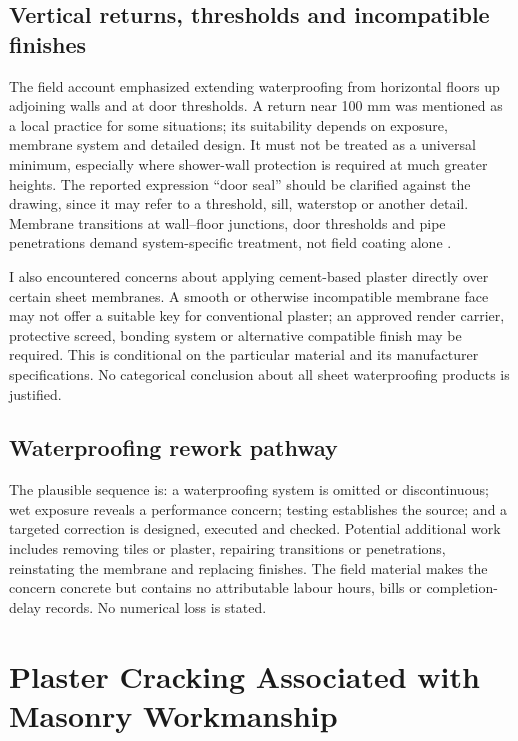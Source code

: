\subsection{Vertical returns, thresholds and incompatible finishes}
The field account emphasized extending waterproofing from horizontal floors up adjoining walls and at door thresholds. A return near 100 mm was mentioned as a local practice for some situations; its suitability depends on exposure, membrane system and detailed design. It must not be treated as a universal minimum, especially where shower-wall protection is required at much greater heights. The reported expression ``door seal'' should be clarified against the drawing, since it may refer to a threshold, sill, waterstop or another detail. Membrane transitions at wall--floor junctions, door thresholds and pipe penetrations demand system-specific treatment, not field coating alone \parencite{laticrete2026,schluter2026}.

I also encountered concerns about applying cement-based plaster directly over certain sheet membranes. A smooth or otherwise incompatible membrane face may not offer a suitable key for conventional plaster; an approved render carrier, protective screed, bonding system or alternative compatible finish may be required. This is conditional on the particular material and its manufacturer specifications. No categorical conclusion about all sheet waterproofing products is justified.

\subsection{Waterproofing rework pathway}
The plausible sequence is: a waterproofing system is omitted or discontinuous; wet exposure reveals a performance concern; testing establishes the source; and a targeted correction is designed, executed and checked. Potential additional work includes removing tiles or plaster, repairing transitions or penetrations, reinstating the membrane and replacing finishes. The field material makes the concern concrete but contains no attributable labour hours, bills or completion-delay records. No numerical loss is stated.


\section{Plaster Cracking Associated with Masonry Workmanship}
